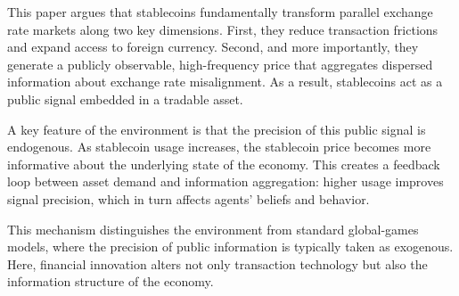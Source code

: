 This paper argues that stablecoins fundamentally transform parallel exchange rate markets along two key dimensions. First, they reduce transaction frictions and expand access to foreign currency. Second, and more importantly, they generate a publicly observable, high-frequency price that aggregates dispersed information about exchange rate misalignment. As a result, stablecoins act as a public signal embedded in a tradable asset.

A key feature of the environment is that the precision of this public signal is endogenous. As stablecoin usage increases, the stablecoin price becomes more informative about the underlying state of the economy. This creates a feedback loop between asset demand and information aggregation: higher usage improves signal precision, which in turn affects agents' beliefs and behavior.

This mechanism distinguishes the environment from standard global-games models, where the precision of public information is typically taken as exogenous. Here, financial innovation alters not only transaction technology but also the information structure of the economy.
